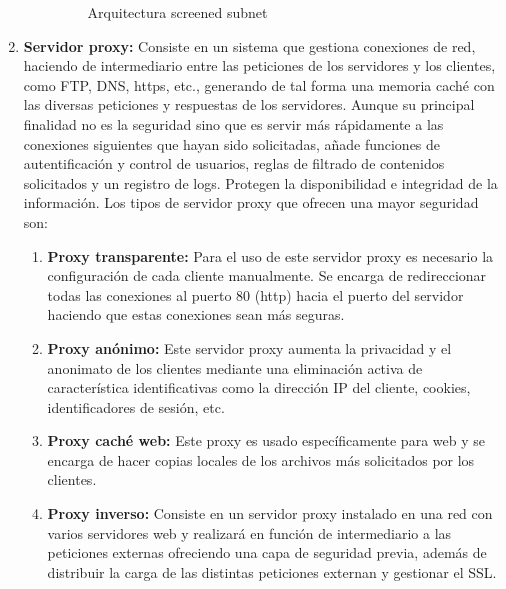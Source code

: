 \begin{enumerate}
\begin{enumerate}
\begin{figure}[tphb]
  		   \caption{Arquitectura screened subnet \cite{firewall}}
  		   \label{img:screened-subnet}
\end{figure}
\end{enumerate}
\item {\bfseries Servidor proxy:}
Consiste en un sistema que gestiona conexiones de red, haciendo de intermediario entre las peticiones de los servidores y los clientes, como FTP, DNS, https, etc., generando de tal forma una memoria caché con las diversas peticiones y respuestas de los servidores. Aunque su principal finalidad no es la seguridad sino que es servir más rápidamente a las conexiones siguientes que hayan sido solicitadas, añade funciones de autentificación y control de usuarios, reglas de filtrado de contenidos solicitados y un registro de logs. Protegen la disponibilidad e integridad de la información. Los tipos de servidor proxy que ofrecen una mayor seguridad son:
\begin{enumerate}
\item {\bfseries Proxy transparente:}
Para el uso de este servidor proxy es necesario la configuración de cada cliente manualmente. Se encarga de redireccionar todas las conexiones al puerto 80 (http) hacia el puerto del servidor haciendo que estas conexiones sean más seguras.
\item {\bfseries Proxy anónimo:} 
Este servidor proxy aumenta la privacidad y el anonimato de los clientes mediante una eliminación activa de característica identificativas como la dirección IP del cliente, cookies, identificadores de sesión, etc.\cite{proxy2}
\item {\bfseries Proxy caché web:}
 Este proxy es usado específicamente para web y se encarga de hacer copias locales de los archivos más solicitados por los clientes.
\item {\bfseries Proxy inverso:}
 Consiste en un servidor proxy instalado en una red con varios servidores web y realizará en función de intermediario a las peticiones externas ofreciendo una capa de seguridad previa, además de distribuir la carga de las distintas peticiones externan y gestionar el SSL.\cite{proxy}
\end{enumerate}
\end{enumerate}
